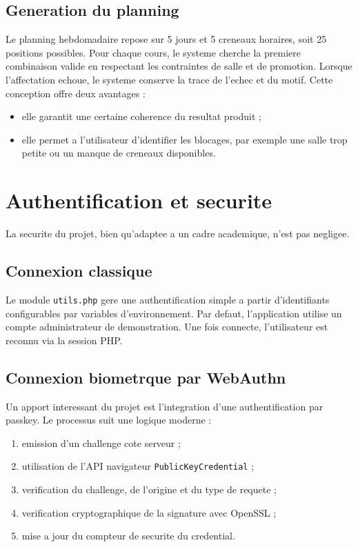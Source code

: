 \documentclass[12pt,a4paper]{article}
\begin{document}
\subsection{Generation du planning}
Le planning hebdomadaire repose sur 5 jours et 5 creneaux horaires, soit 25 positions possibles. Pour chaque cours, le systeme cherche la premiere combinaison valide en respectant les contraintes de salle et de promotion. Lorsque l'affectation echoue, le systeme conserve la trace de l'echec et du motif. Cette conception offre deux avantages :
\begin{itemize}
    \item elle garantit une certaine coherence du resultat produit ;
    \item elle permet a l'utilisateur d'identifier les blocages, par exemple une salle trop petite ou un manque de creneaux disponibles.
\end{itemize}

\section{Authentification et securite}
La securite du projet, bien qu'adaptee a un cadre academique, n'est pas negligee.

\subsection{Connexion classique}
Le module \texttt{utils.php} gere une authentification simple a partir d'identifiants configurables par variables d'environnement. Par defaut, l'application utilise un compte administrateur de demonstration. Une fois connecte, l'utilisateur est reconnu via la session PHP.

\subsection{Connexion biometrque par WebAuthn}
Un apport interessant du projet est l'integration d'une authentification par passkey. Le processus suit une logique moderne :
\begin{enumerate}
    \item emission d'un challenge cote serveur ;
    \item utilisation de l'API navigateur \texttt{PublicKeyCredential} ;
    \item verification du challenge, de l'origine et du type de requete ;
    \item verification cryptographique de la signature avec OpenSSL ;
    \item mise a jour du compteur de securite du credential.
\end{enumerate}
\end{document}
